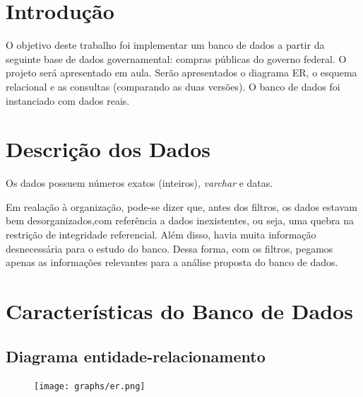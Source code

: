 \documentclass{article}
\begin{document}
\newpage
{}
\section{Introdução}
O objetivo deste trabalho foi implementar um banco de dados a partir da seguinte base de dados
governamental: compras públicas do governo federal. O projeto será apresentado em aula. Serão apresentados o diagrama
ER, o esquema relacional e as consultas (comparando as duas versões). O banco de dados foi instanciado
com dados reais.
\section{Descrição dos Dados}
Os dados possuem números exatos (inteiros), \textit{varchar} e datas.
\par Em realação à organização, pode-se dizer que, antes dos filtros, os dados estavam bem
desorganizados,com referência a dados inexistentes, ou seja, uma quebra na restrição de integridade referencial.
Além disso, havia muita informação desnecessária para o estudo do banco. Dessa forma, com os filtros,
pegamos apenas as informações relevantes para a análise proposta do banco de dados. 
\section{Características do Banco de Dados}
\subsection { Diagrama entidade-relacionamento}
\begin{figure}[H]
  \begin{center}  
    \texttt{[image: graphs/er.png]}    
  \end{center}  
  \label{fig:graph}
\end{figure}
\pagebreak
\end{document}
